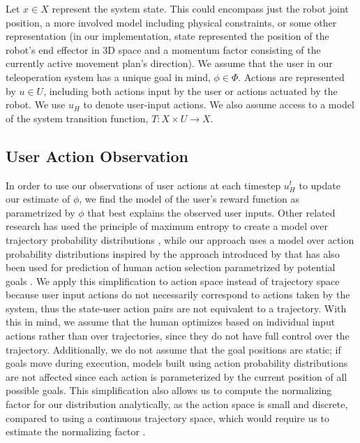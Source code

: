\documentclass[conference]{IEEEtran}
\begin{document}
Let $ x \in X $ represent the system state. This could encompass just the robot joint position, a more involved model including physical constraints, or some other representation (in our implementation, state represented the position of the robot's end effector in 3D space and a momentum factor consisting of the currently active movement plan's direction). We assume that the user in our teleoperation system has a unique goal in mind, $\phi \in \Phi$. Actions are represented by $ u \in U $, including both actions input by the user or actions actuated by the robot. We use $u_H$ to denote user-input actions. We also assume access to a model of the system transition function, $T: X \times U \rightarrow X$.

\subsection{User Action Observation}
In order to use our observations of user actions at each timestep $u_H^t$ to update our estimate of $\phi$, we find the model of the user's reward function as parametrized by $\phi$ that best explains the observed user inputs. Other related research has used the principle of maximum entropy \cite{ziebart2008maximum} to create a model over trajectory probability distributions \cite{dragan2012formalizing, javdani2015shared}, while our approach uses a model over action probability distributions inspired by the approach introduced by  \citet{ramachandran2007bayesian} that has also been used for prediction of human action selection parametrized by potential goals \cite{fisac2018probabilistically}. We apply this simplification to action space instead of trajectory space because user input actions do not necessarily correspond to actions taken by the system, thus the state-user action pairs are not equivalent to a trajectory. With this in mind, we assume that the human optimizes based on individual input actions rather than over trajectories, since they do not have full control over the trajectory. Additionally, we do not assume that the goal positions are static; if goals move during execution, models built using action probability distributions are not affected since each action is parameterized by the current position of all possible goals. This simplification also allows us to compute the normalizing factor for our distribution analytically, as the action space is small and discrete, compared to using a continuous trajectory space, which would require us to estimate the normalizing factor \cite{javdani2015shared}.
\end{document}
